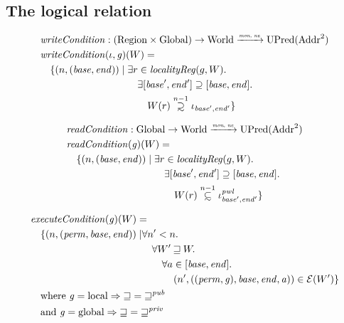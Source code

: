 \documentclass[a4paper]{article}
\newcommand{\monnefun}{\xrightarrow{\textit{\tiny{mon, ne}}}}
\newcommand{\fun}{\rightarrow}
\newcommand\subsetsim{\mathrel{\ooalign{\raise.2ex\hbox{$\subset$}\cr
      \hidewidth\lower.8ex\hbox{\scalebox{0.9}{$\sim$}}\hidewidth\cr}}}
\newcommand\supsetsim{\mathrel{\ooalign{\raise.2ex\hbox{$\supset$}\cr
      \hidewidth\lower.8ex\hbox{\scalebox{0.9}{$\sim$}}\hidewidth\cr}}}
\newcommand{\nsubsim}[1][n]{\stackrel{\tiny{#1}}{\subsetsim}}
\newcommand{\nsupsim}[1][n]{\stackrel{\tiny{#1}}{\supsetsim}}
\newcommand{\var}[1]{\mathit{#1}}
\newcommand{\gl}{\var{g}}
\newcommand{\addr}{\var{a}}
\newcommand{\start}{\var{base}}
\newcommand{\addrend}{\var{end}}
\newcommand{\perm}{\var{perm}}
\newcommand{\pwl}{\var{pwl}}
\newcommand{\plainfun}[2]{
  \ifthenelse{\equal{#2}{}}
  {\mathit{#1}}
  {\mathit{#1}(#2)}
}
\newcommand{\readCond}[1]{\plainfun{readCondition}{#1}}
\newcommand{\writeCond}[1]{\plainfun{writeCondition}{#1}}
\newcommand{\execCond}[1]{\plainfun{executeCondition}{#1}}
\newcommand{\future}{\mathbin{\sqsupseteq}}
\newcommand{\futurewk}{\mathbin{\sqsupseteq}^{\var{pub}}}
\newcommand{\futurestr}{\mathbin{\sqsupseteq}^{\var{priv}}}
\newcommand{\asmType}{\plaindom{AsmType}}
\newcommand{\plaindom}[1]{\mathrm{#1}}
\newcommand{\Addrs}{\plaindom{Addr}}
\newcommand{\Globals}{\plaindom{Global}}
\newcommand{\Regions}{\plaindom{Region}}
\newcommand{\Worlds}{\plaindom{World}}
\newcommand{\UPred}[1]{\plaindom{UPred}(#1)}
\newcommand{\intr}[2]{\mathcal{#1}}
\newcommand{\exprintr}[1]{\intr{E}{#1}}
\newcommand{\stder}{\exprintr{\asmType}}
\newcommand{\npair}[2][n]{\left(#1,#2 \right)}
\newcommand{\plainperm}[1]{\mathrm{#1}}
\newcommand{\local}{\plainperm{local}}
\newcommand{\glob}{\plainperm{global}}
\begin{document}
\subsection{The logical relation}

\begin{align*}
  & \writeCond{} : (\Regions \times \Globals) \fun \Worlds \monnefun \UPred{\Addrs^2}  \\
  & \writeCond{}(\iota,\gl)(W) =  \\
  & \quad \begin{aligned}[t]
    \{ \npair{(\start,\addrend)} \mid & \;\exists r \in \var{localityReg}(g,W) \ldotp \\
    & \;\quad \exists [\start',\addrend'] \supseteq [\start,\addrend] \ldotp \\
    & \;\qquad W(r)\nsupsim[n-1] \iota_{\start',\addrend'} \}
  \end{aligned}
\end{align*}

\begin{align*}
  & \readCond{} : \Globals \fun \Worlds \monnefun \UPred{\Addrs^2}  \\
  & \readCond{}(\gl)(W) =  \\
  & \quad \begin{aligned}[t]
    \{ \npair{(\start,\addrend)} \mid & \;\exists r \in \var{localityReg}(g,W) \ldotp \\
    & \;\quad \exists [\start',\addrend'] \supseteq [\start,\addrend] \ldotp \\
    & \;\qquad W(r)\nsubsim[n-1] \iota_{\start',\addrend'}^\pwl \}
  \end{aligned}
\end{align*}

\begin{align*}
  & \execCond{}(\gl)(W) = \\
  & \quad
    \begin{aligned}[t]
      \{ \npair{(\perm,\start,\addrend)} \mid &  \forall n' < n \ldotp\\
      & \quad \forall W' \future W \ldotp\\
      & \qquad\forall a \in [\start,\addrend] \ldotp\\
      & \qquad \quad \npair[n']{((\perm,\gl),\start,\addrend,\addr)} \in \stder(W')\}
    \end{aligned} \\
  & \quad \text{where } \gl = \local \Rightarrow \future = \futurewk \\
  & \quad \text{and } \gl = \glob \Rightarrow \future = \futurestr
\end{align*}
\end{document}
